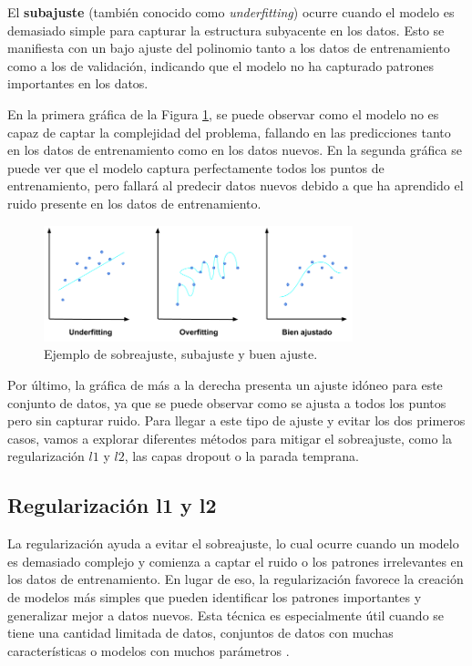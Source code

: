 El \textbf{subajuste} (también conocido como \textit{underfitting}) ocurre cuando el modelo es demasiado simple para capturar la estructura subyacente en los datos. Esto se manifiesta con un bajo ajuste del polinomio tanto a los datos de entrenamiento como a los de validación, indicando que el modelo no ha capturado patrones importantes en los datos.

En la primera gráfica de la Figura \ref{fig:overfitting}, se puede observar como el modelo no es capaz de captar la complejidad del problema, fallando en las predicciones tanto en los datos de entrenamiento como en los datos nuevos. En la segunda gráfica se puede ver que el modelo captura perfectamente todos los puntos de entrenamiento, pero fallará al predecir datos nuevos debido a que ha aprendido el ruido presente en los datos de entrenamiento.

\begin{figure}[h!]
    \centering
    \includegraphics[width=0.8\textwidth]{img/overfitting.png}
    \caption{Ejemplo de sobreajuste, subajuste y buen ajuste.}
    \label{fig:overfitting}
\end{figure}

Por último, la gráfica de más a la derecha presenta un ajuste idóneo para este conjunto de datos, ya que se puede observar como se ajusta a todos los puntos pero sin capturar ruido. Para llegar a este tipo de ajuste y evitar los dos primeros casos, vamos a explorar diferentes métodos para mitigar el sobreajuste, como la regularización $l1$ y $l2$, las capas dropout o la parada temprana.

\subsection{Regularización l1 y l2} \label{sec:regularizacion}

La regularización ayuda a evitar el sobreajuste, lo cual ocurre cuando un modelo es demasiado complejo y comienza a captar el ruido o los patrones irrelevantes en los datos de entrenamiento. En lugar de eso, la regularización favorece la creación de modelos más simples que pueden identificar los patrones importantes y generalizar mejor a datos nuevos. Esta técnica es especialmente útil cuando se tiene una cantidad limitada de datos, conjuntos de datos con muchas características o modelos con muchos parámetros \citep{pajares2021aprendizaje}.

